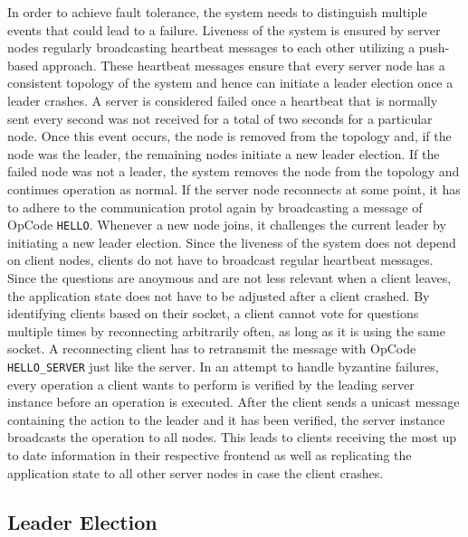 \documentclass[runningheads]{llncs}
\begin{document}
In order to achieve fault tolerance, the system needs to distinguish multiple
events that could lead to a failure. Liveness of the system is ensured by
server nodes regularly broadcasting heartbeat messages to each other utilizing a push-based approach. These
heartbeat messages ensure that every server node has a consistent topology of
the system and hence can initiate a leader election once a leader crashes.
A server is considered failed once a heartbeat that is normally sent every
second was not received for a total of two seconds for a particular node.
Once this event occurs, the node is removed from the topology and, if the node
was the leader, the remaining nodes initiate a new leader election.
If the failed node was not a leader, the system removes the node from the
topology and continues operation as normal.
\newline
\newline
If the server node reconnects at some point, it has to adhere to the
communication protol again by broadcasting a message of OpCode \texttt{HELLO}. 
Whenever a new node joins, it challenges the current leader by initiating a new
leader election.
\newline
\newline
Since the liveness of the system does not depend on client nodes, clients do not
have to broadcast regular heartbeat messages. Since the questions are anoymous
and are not less relevant when a client leaves, the application state does not
have to be adjusted after a client crashed.
\newline
\newline
By identifying clients based on their socket, a client cannot vote for questions
multiple times by reconnecting arbitrarily often, as long as it is using the same
socket. A reconnecting client has to retransmit the message with OpCode
\texttt{HELLO\_SERVER} just like the server.
\newline
\newline
In an attempt to handle byzantine failures, every operation a client wants to
perform is verified by the leading server instance before an operation is
executed. After the client sends a unicast message containing the action to the
leader and it has been verified, the server instance broadcasts the operation
to all nodes. This leads to clients receiving the most up to date information
in their respective frontend as well as replicating the application state to
all other server nodes in case the client crashes.


\subsection{Leader Election}
\end{document}
